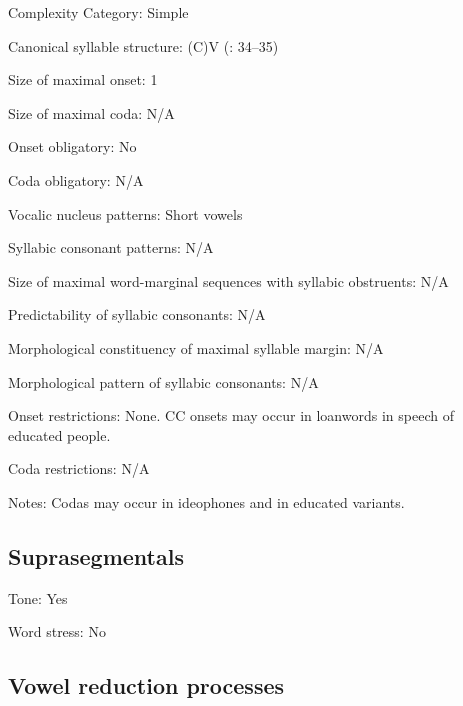 {\begin{appendixdesc}
\item[Complexity Category:] Simple

\item[Canonical syllable structure:] (C)V (\citealt{BlackingsFabb2003}: 34--35)

\item[Size of maximal onset:] 1

\item[Size of maximal coda:] N/A

\item[Onset obligatory:] No

\item[Coda obligatory:] N/A

\item[Vocalic nucleus patterns:] Short vowels

\item[Syllabic consonant patterns:] N/A

\item[Size of maximal word-marginal sequences with syllabic obstruents:] N/A

\item[Predictability of syllabic consonants:] N/A

\item[Morphological constituency of maximal syllable margin:] N/A

\item[Morphological pattern of syllabic consonants:] N/A

\item[Onset restrictions:] None. CC onsets may occur in loanwords in speech of educated people.

\item[Coda restrictions:] N/A

\item[Notes:] Codas may occur in ideophones and in educated variants.
\end{appendixdesc}
\subsection*{Suprasegmentals}
\begin{appendixdesc}
\item[Tone:] Yes

\item[Word stress:] No
\end{appendixdesc}
\subsection*{Vowel reduction processes}

}
